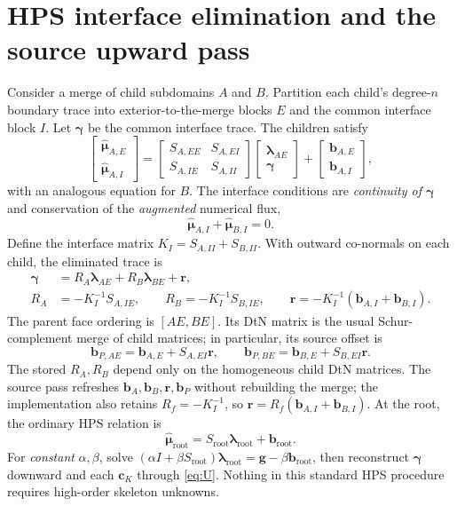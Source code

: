 \documentclass[11pt,letterpaper]{article}
\newcommand{\lam}{\boldsymbol\lambda}
\newcommand{\gam}{\boldsymbol\gamma}
\newcommand{\muh}{\widehat{\boldsymbol\mu}}
\newcommand{\bb}{\mathbf b}
\newcommand{\gvec}{\mathbf g}
\newcommand{\cc}{\mathbf c}
\begin{document}
\section{HPS interface elimination and the source upward pass}
Consider a merge of child subdomains \(A\) and \(B\). Partition each child's degree-\(n\) boundary trace into exterior-to-the-merge blocks \(E\) and the common interface block \(I\). Let \(\gam\) be the common interface trace. The children satisfy
\begin{equation}\label{eq:childflux}
 \begin{bmatrix}\muh_{A,E}\\\muh_{A,I}\end{bmatrix}
 =\begin{bmatrix}S_{A,EE}&S_{A,EI}\\S_{A,IE}&S_{A,II}\end{bmatrix}
 \begin{bmatrix}\lam_{AE}\\\gam\end{bmatrix}
 +\begin{bmatrix}\bb_{A,E}\\\bb_{A,I}\end{bmatrix},
\end{equation}
with an analogous equation for \(B\). The interface conditions are \emph{continuity of \(\gam\)} and conservation of the \emph{augmented} numerical flux,
\begin{equation}\label{eq:interface}
 \muh_{A,I}+\muh_{B,I}=0.
\end{equation}
Define the interface matrix \(K_I=S_{A,II}+S_{B,II}\). With outward co-normals on each child, the eliminated trace is
\begin{align}\label{eq:gamma}
 \gam&=R_A\lam_{AE}+R_B\lam_{BE}+\mathbf r,\\
 R_A&=-K_I^{-1}S_{A,IE},\qquad
 R_B=-K_I^{-1}S_{B,IE},\qquad
 \mathbf r=-K_I^{-1}(\bb_{A,I}+\bb_{B,I}).\nonumber
\end{align}
The parent face ordering is \([AE,BE]\). Its DtN matrix is the usual Schur-complement merge of child matrices; in particular, its source offset is
\begin{equation}\label{eq:parentb}
 \boxed{\quad
 \bb_{P,AE}=\bb_{A,E}+S_{A,EI}\mathbf r,\qquad
 \bb_{P,BE}=\bb_{B,E}+S_{B,EI}\mathbf r.\quad}
\end{equation}
The stored \(R_A,R_B\) depend only on the homogeneous child DtN matrices. The source pass refreshes \(\bb_A,\bb_B,\mathbf r,\bb_P\) without rebuilding the merge; the implementation also retains \(R_f=-K_I^{-1}\), so \(\mathbf r=R_f(\bb_{A,I}+\bb_{B,I})\). At the root, the ordinary HPS relation is
\begin{equation}\label{eq:rootdtn}
 \muh_{\mathrm{root}}=S_{\mathrm{root}}\lam_{\mathrm{root}}+\bb_{\mathrm{root}}.
\end{equation}
For \emph{constant} \(\alpha,\beta\), solve \((\alpha I+\beta S_{\mathrm{root}})\lam_{\mathrm{root}}=\gvec-\beta\bb_{\mathrm{root}}\), then reconstruct \(\gam\) downward and each \(\cc_K\) through \eqref{eq:U}. Nothing in this standard HPS procedure requires high-order skeleton unknowns.
\end{document}
